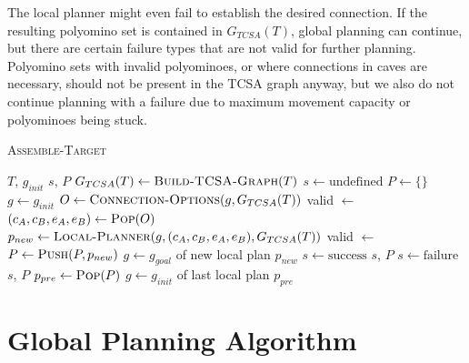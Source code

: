 The local planner might even fail to establish the desired connection.
If the resulting polyomino set is contained in $G_{TCSA}(T)$, global planning can continue, but there are certain failure types that are not valid for further planning.
Polyomino sets with invalid polyominoes, or where connections in caves are necessary, should not be present in the TCSA graph anyway, but we also do not continue planning with a failure due to maximum movement capacity or polyominoes being stuck.

\begin{algorithm}
	\caption{\scshape Assemble-Target}
	\label{algo:global_algo}
	\begin{algorithmic}[1]
		\REQUIRE $T$, $g_{init}$
		\ENSURE $s$, $P$ 
		\STATE $G_{TCSA}(T) \gets \text{\scshape Build-TCSA-Graph}(T)$
		\STATE $s \gets \text{undefined}$
		\STATE $P \gets \{\}$ 
		\STATE $g \gets g_{init}$ 
		\LOOP
			\STATE $O \gets \text{\scshape Connection-Options}(g, G_{TCSA}(T))$
			\STATE valid $\gets$ \FALSE
				\STATE $(c_A, c_B, e_A, e_B) \gets \text{\scshape Pop}(O)$
				\STATE $p_{new} \gets \text{\scshape Local-Planner}(g, (c_A, c_B, e_A, e_B), G_{TCSA}(T))$
					\STATE valid $\gets$ \TRUE
				\ENDIF
			\ENDWHILE
				\STATE $P \gets \text{\scshape Push}(P, p_{new})$ 
				\STATE $g \gets g_{goal}$ of new local plan $p_{new}$ 
					\STATE $s \gets \text{success}$
					\RETURN $s$, $P$
				\ENDIF
			\ELSE
					\STATE $s \gets \text{failure}$
					\RETURN $s$, $P$
				\ENDIF
				\STATE $p_{pre} \gets \text{\scshape Pop}(P)$ 
				\STATE $g \gets g_{init}$ of last local plan $p_{pre}$ 
			\ENDIF
		\ENDLOOP
	\end{algorithmic}
\end{algorithm}


\section{Global Planning Algorithm}
\label{sec:global_algo}

